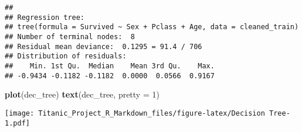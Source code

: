 \documentclass[
]{article}
\newenvironment{Shaded}{\begin{snugshade}}{\end{snugshade}}
\newcommand{\AttributeTok}[1]{\textcolor[rgb]{0.13,0.29,0.53}{#1}}
\newcommand{\DecValTok}[1]{\textcolor[rgb]{0.00,0.00,0.81}{#1}}
\newcommand{\FunctionTok}[1]{\textcolor[rgb]{0.13,0.29,0.53}{\textbf{#1}}}
\newcommand{\NormalTok}[1]{#1}
\begin{document}
\begin{verbatim}
## 
## Regression tree:
## tree(formula = Survived ~ Sex + Pclass + Age, data = cleaned_train)
## Number of terminal nodes:  8 
## Residual mean deviance:  0.1295 = 91.4 / 706 
## Distribution of residuals:
##    Min. 1st Qu.  Median    Mean 3rd Qu.    Max. 
## -0.9434 -0.1182 -0.1182  0.0000  0.0566  0.9167
\end{verbatim}

\begin{Shaded}
\begin{Highlighting}[]
\FunctionTok{plot}\NormalTok{(dec\_tree)}
\FunctionTok{text}\NormalTok{(dec\_tree, }\AttributeTok{pretty =} \DecValTok{1}\NormalTok{)}
\end{Highlighting}
\end{Shaded}

\texttt{[image: Titanic\_Project\_R\_Markdown\_files/figure-latex/Decision Tree-1.pdf]}
\end{document}
